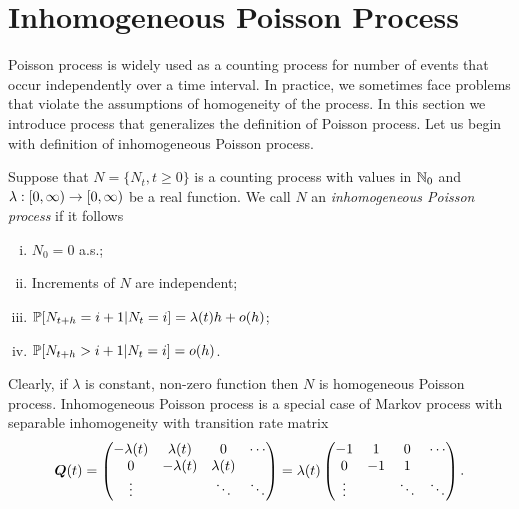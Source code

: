 {%
\section{Inhomogeneous Poisson Process}
\label{chap:poisson}

Poisson process is widely used as a counting process for number of events that occur independently over a time interval. In practice, we sometimes face problems that violate the assumptions of homogeneity of the process. In this section we introduce process that generalizes the definition of Poisson process. Let us begin with definition of inhomogeneous Poisson process.

\begin{definition}
	\label{def:inhomogeneousPoisson}
	Suppose that $N = \{N_t, t \geq 0\}$ is a counting process with values in $\mathbb{N}_0$ and $\lambda : [0, \infty) \to [0, \infty)$ be a real function. We call $N$ an \emph{inhomogeneous Poisson process} if it follows
	\begin{enumerate}[i)]
		\item $N_0 = 0$ a.s.;
		\item Increments of $N$ are independent;
		\item $\operatorname{\mathbb{P}} [ N_{t+h} = i+1 \vert N_t = i ] = \lambda(t) h + o(h)$;
		\item $\operatorname{\mathbb{P}} [ N_{t+h} > i+1 \vert N_t = i ] = o(h)$.
	\end{enumerate}
\end{definition}

Clearly, if $\lambda$ is constant, non-zero function then $N$ is homogeneous Poisson process. Inhomogeneous Poisson process is a special case of Markov process with separable inhomogeneity with transition rate matrix
\[
	\bm{Q}(t) = \begin{pmatrix}
			-\lambda (t) & \lambda (t) & 0 & \cdots \\
			0 & -\lambda (t) & \lambda (t) &  \\
			\vdots & & \ddots & \ddots
\end{pmatrix} = \lambda (t) \begin{pmatrix}
			-1 & 1 & 0 & \cdots \\
			0 & -1 & 1 &  \\
			\vdots & & \ddots & \ddots
\end{pmatrix}.
\]

}

